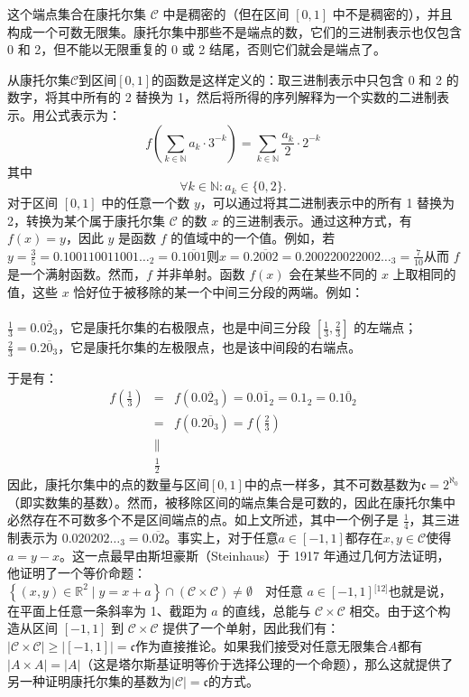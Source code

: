 这个端点集合在康托尔集 $\mathcal{C}$ 中是稠密的（但在区间 $[0,1]$ 中不是稠密的），并且构成一个可数无限集。康托尔集中那些不是端点的数，它们的三进制表示也仅包含 0 和 2，但不能以无限重复的 0 或 2 结尾，否则它们就会是端点了。

从康托尔集$\mathcal{C}$到区间$[0,1]$的函数是这样定义的：取三进制表示中只包含 0 和 2 的数字，将其中所有的 2 替换为 1，然后将所得的序列解释为一个实数的二进制表示。用公式表示为：
$$
f\left(\sum_{k \in \mathbb{N}} a_k \cdot 3^{-k} \right) = \sum_{k \in \mathbb{N}} \frac{a_k}{2} \cdot 2^{-k}~
$$
其中
$$
\forall k \in \mathbb{N} : a_k \in \{0, 2\}.~
$$
对于区间 $[0,1]$ 中的任意一个数 $y$，可以通过将其二进制表示中的所有 1 替换为 2，转换为某个属于康托尔集 $\mathcal{C}$ 的数 $x$ 的三进制表示。通过这种方式，有 $f(x) = y$，因此 $y$ 是函数 $f$ 的值域中的一个值。例如，若$y = \frac{3}{5} = 0.100110011001\ldots_2 = 0.\overline{1001}$则$x = 0.\overline{2002}= 0.200220022002\ldots_3 = \frac{7}{10}$从而 $f$ 是一个满射函数。然而，$f$ 并非单射。函数 $f(x)$ 会在某些不同的 $x$ 上取相同的值，这些 $x$ 恰好位于被移除的某一个中间三分段的两端。例如：\\\\
$\frac{1}{3} = 0.0\overline{2}_3$，它是康托尔集的右极限点，也是中间三分段 $[ \frac{1}{3}, \frac{2}{3} ]$ 的左端点；\\
$\frac{2}{3} = 0.2\overline{0}_3$，它是康托尔集的左极限点，也是该中间段的右端点。

于是有：
$$
\begin{array}{lcl}
f\left( \frac{1}{3} \right) &=& f(0.0\overline{2}_3) = 0.0\overline{1}_2 = 0.1_2 = 0.1\overline{0}_2 \\
&=& f(0.2\overline{0}_3) = f\left( \frac{2}{3} \right) \\
&\parallel \\
&\frac{1}{2}
\end{array}~
$$
因此，康托尔集中的点的数量与区间$[0, 1]$中的点一样多，其不可数基数为$\mathfrak{c} = 2^{\aleph_0}$（即实数集的基数）。然而，被移除区间的端点集合是可数的，因此在康托尔集中必然存在不可数多个不是区间端点的点。如上文所述，其中一个例子是 $\frac{1}{4}$，其三进制表示为 $0.020202\ldots_3 = 0.\overline{02}$。事实上，对于任意$a \in [-1, 1]$都存在$x, y \in \mathcal{C}$使得$a = y - x$。这一点最早由斯坦豪斯（Steinhaus）于 1917 年通过几何方法证明，他证明了一个等价命题：$\left\{(x, y) \in \mathbb{R}^2 \mid y = x + a \right\} \cap (\mathcal{C} \times \mathcal{C}) \neq \emptyset\quad \text{对任意 } a \in [-1, 1]$\(^\text{[12]}\)也就是说，在平面上任意一条斜率为 1、截距为 $a$ 的直线，总能与 $\mathcal{C} \times \mathcal{C}$ 相交。由于这个构造从区间 $[-1, 1]$ 到 $\mathcal{C} \times \mathcal{C}$ 提供了一个单射，因此我们有：$|\mathcal{C} \times \mathcal{C}| \geq |[-1, 1]| = \mathfrak{c}$作为直接推论。如果我们接受对任意无限集合$A$都有$|A \times A| = |A|$（这是塔尔斯基证明等价于选择公理的一个命题），那么这就提供了另一种证明康托尔集的基数为$|\mathcal{C}| = \mathfrak{c}$的方式。

